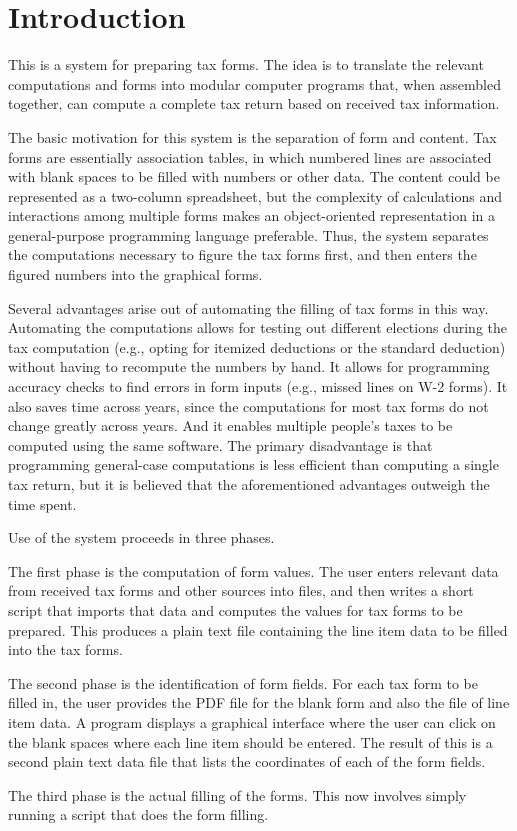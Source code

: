 \section{Introduction}

This is a system for preparing tax forms. The idea is to translate the relevant
computations and forms into modular computer programs that, when assembled
together, can compute a complete tax return based on received tax information.

The basic motivation for this system is the separation of form and content. Tax
forms are essentially association tables, in which numbered lines are associated
with blank spaces to be filled with numbers or other data. The content could be
represented as a two-column spreadsheet, but the complexity of calculations and
interactions among multiple forms makes an object-oriented representation
in a general-purpose programming language preferable. Thus, the system separates
the computations necessary to figure the tax forms first, and then enters the
figured numbers into the graphical forms.

Several advantages arise out of automating the filling of tax forms in this way.
Automating the computations allows for testing out different elections during
the tax computation (e.g., opting for itemized deductions or the standard
deduction) without having to recompute the numbers by hand. It allows for
programming accuracy checks to find errors in form inputs (e.g., missed lines on
W-2 forms). It also saves time across years, since the computations for most tax
forms do not change greatly across years. And it enables multiple people's taxes
to be computed using the same software. The primary disadvantage is that
programming general-case computations is less efficient than computing a single
tax return, but it is believed that the aforementioned advantages outweigh the
time spent.

Use of the system proceeds in three phases.

The first phase is the computation of form values. The user enters relevant data
from received tax forms and other sources into files, and then writes a short
script that imports that data and computes the values for tax forms to be
prepared. This produces a plain text file containing the line item data to be
filled into the tax forms.

The second phase is the identification of form fields. For each tax form to be
filled in, the user provides the PDF file for the blank form and also the file
of line item data. A program displays a graphical interface where the user can
click on the blank spaces where each line item should be entered. The result of
this is a second plain text data file that lists the coordinates of each of the
form fields.

The third phase is the actual filling of the forms. This now involves simply
running a script that does the form filling.





